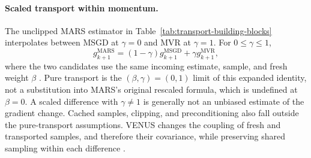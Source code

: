 \paragraph{Scaled transport within momentum.}
The unclipped MARS estimator in
Table~\ref{tab:transport-building-blocks} interpolates between MSGD
at $\gamma=0$ and MVR at $\gamma=1$. For $0\leq\gamma\leq1$,
\[
g_{k+1}^{\mathrm{MARS}}
=(1-\gamma)g_{k+1}^{\mathrm{MSGD}}
+\gamma g_{k+1}^{\mathrm{MVR}},
\]
where the two candidates use the same incoming estimate, sample,
and fresh weight $\beta$ \citep{venus2026draft}.
Pure transport is the $(\beta,\gamma)=(0,1)$ limit of this expanded
identity, not a substitution into MARS's original rescaled formula,
which is undefined at $\beta=0$.
A scaled difference with $\gamma\ne1$ is generally not an unbiased
estimate of the gradient change. Cached samples, clipping, and
preconditioning also fall outside the pure-transport assumptions.
VENUS changes the coupling of fresh and transported samples, and
therefore their covariance, while preserving shared sampling within
each difference \citep{venus2026draft}.

